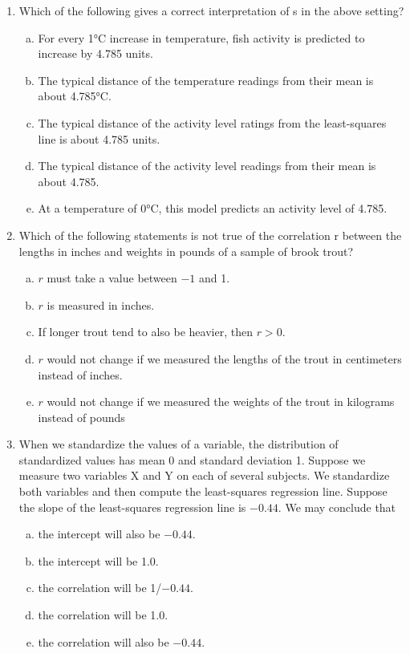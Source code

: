 \documentclass[a4paper,12pt,twoside]{book}
\begin{document}
\begin{enumerate}
 \item Which of the following gives a correct interpretation of s in the above setting?
     \begin{enumerate}[(a)]
         \item For every 1\si{\degreeCelsius} increase in temperature, fish activity is predicted to increase by 4.785 units.
         \item The typical distance of the temperature readings from their mean is about 4.785\si{\degreeCelsius}.
         \item The typical distance of the activity level ratings from the least-squares line is about 4.785 units.
         \item The typical distance of the activity level readings from their mean is about 4.785.
         \item At a temperature of 0\si{\degreeCelsius}, this model predicts an activity level of 4.785.
     \end{enumerate}
     \vspace{0.3cm}
     
 \item Which of the following statements is not true of the correlation r between the lengths in inches and weights in pounds of a sample of brook trout?
 
     \begin{enumerate}[(a)]
         \item $r$ must take a value between $−1$ and 1.
         \item $r$ is measured in inches.
         \item If longer trout tend to also be heavier, then $r > 0$.
         \item $r$ would not change if we measured the lengths of the trout in centimeters instead of inches.
         \item $r$ would not change if we measured the weights of the trout in kilograms instead of pounds
     \end{enumerate}
     
 \item  When we standardize the values of a variable, the distribution of standardized values has mean 0 and standard  deviation 1. Suppose we measure two variables X and Y on each of several subjects. We standardize both variables and then compute the least-squares regression line. Suppose the slope of the least-squares regression line is $-0.44$. We may conclude that
        \begin{enumerate}[(a)]
            \item the intercept will also be $-0.44$.
            \item the intercept will be 1.0.
            \item the correlation will be 1/$-0.44$.
            \item the correlation will be 1.0.
            \item the correlation will also be $-0.44$.
        \end{enumerate}
        \vspace{0.3cm}
        

\end{enumerate}
\end{document}
